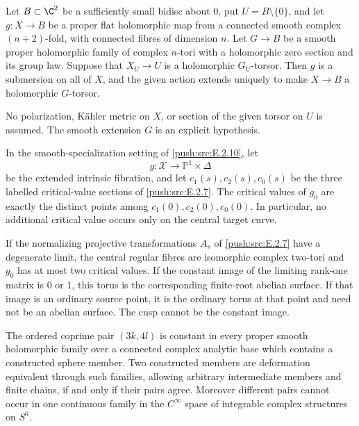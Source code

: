 \begin{proposition}\hypertarget{tag-032W}{}\label{push:src:E.2.11}


Let $B\subset\C^2$ be a sufficiently small bidisc about $0$, put
$U=B\setminus\{0\}$, and let $g:X\to B$ be a proper flat
holomorphic map from a connected smooth complex $(n+2)$-fold,
with connected fibres of dimension $n$.  Let $G\to B$ be a
smooth proper holomorphic family of complex $n$-tori with a
holomorphic zero section and its group law.  Suppose that
$X_U\to U$ is a holomorphic $G_U$-torsor.  Then $g$ is a
submersion on all of $X$, and the given action extends uniquely
to make $X\to B$ a holomorphic $G$-torsor.

No polarization, K\"ahler metric on $X$, or section of the
given torsor on $U$ is assumed.  The smooth extension $G$ is
an explicit hypothesis.
\end{proposition}

\begin{proposition}\hypertarget{tag-032X}{}\label{push:src:E.2.12}


In the smooth-specialization setting of \ref{push:src:E.2.10}, let
\[
 g:\mathcal X\longrightarrow\mathbb P^1\times\Delta
\]
be the extended intrinsic fibration, and let
$c_1(s),c_2(s),c_0(s)$ be the three labelled critical-value
sections of \ref{push:src:E.2.7}.  The critical values of $g_0$ are exactly
the distinct points among $c_1(0),c_2(0),c_0(0)$.
In particular, no additional critical value occurs only
on the central target curve.

If the normalizing projective transformations $A_s$ of
\ref{push:src:E.2.7} have a degenerate limit, the central regular fibres
are isomorphic complex two-tori and $g_0$ has at most two
critical values.  If the constant image of the limiting
rank-one matrix is $0$ or $1$, this torus is the
corresponding finite-root abelian surface.  If that image
is an ordinary source point, it is the ordinary torus at
that point and need not be an abelian surface.  The cusp
cannot be the constant image.
\end{proposition}

\begin{corollary}\hypertarget{tag-033C}{}\label{push:src:E.2.4}


The ordered coprime pair $(3k,4l)$ is constant in every
proper smooth holomorphic family over a connected complex
analytic base which contains a constructed sphere member.
Two constructed members are deformation equivalent through
such families, allowing arbitrary intermediate members and
finite chains, if and only if their pairs agree.
Moreover different pairs cannot occur in one continuous
family in the $C^\infty$ space of integrable complex
structures on $S^6$.
\end{corollary}

